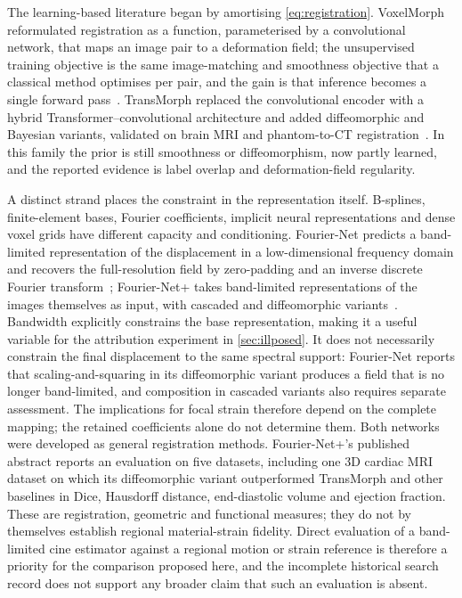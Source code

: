 The learning-based literature began by amortising \cref{eq:registration}. VoxelMorph reformulated registration as a function, parameterised by a convolutional network, that maps an image pair to a deformation field; the unsupervised training objective is the same image-matching and smoothness objective that a classical method optimises per pair, and the gain is that inference becomes a single forward pass~\cite{balakrishnan2019voxelmorph}. TransMorph replaced the convolutional encoder with a hybrid Transformer--convolutional architecture and added diffeomorphic and Bayesian variants, validated on brain MRI and phantom-to-CT registration~\cite{chen2022transmorph}. In this family the prior is still smoothness or diffeomorphism, now partly learned, and the reported evidence is label overlap and deformation-field regularity.

A distinct strand places the constraint in the representation itself. B-splines, finite-element bases, Fourier coefficients, implicit neural representations and dense voxel grids have different capacity and conditioning. Fourier-Net predicts a band-limited representation of the displacement in a low-dimensional frequency domain and recovers the full-resolution field by zero-padding and an inverse discrete Fourier transform~\cite{jia2023fouriernet}; Fourier-Net+ takes band-limited representations of the images themselves as input, with cascaded and diffeomorphic variants~\cite{jia2026fouriernetplus}. Bandwidth explicitly constrains the base representation, making it a useful variable for the attribution experiment in \cref{sec:illposed}. It does not necessarily constrain the final displacement to the same spectral support: Fourier-Net reports that scaling-and-squaring in its diffeomorphic variant produces a field that is no longer band-limited, and composition in cascaded variants also requires separate assessment. The implications for focal strain therefore depend on the complete mapping; the retained coefficients alone do not determine them. Both networks were developed as general registration methods. Fourier-Net+'s published abstract reports an evaluation on five datasets, including one 3D cardiac MRI dataset on which its diffeomorphic variant outperformed TransMorph and other baselines in Dice, Hausdorff distance, end-diastolic volume and ejection fraction. These are registration, geometric and functional measures; they do not by themselves establish regional material-strain fidelity. Direct evaluation of a band-limited cine estimator against a regional motion or strain reference is therefore a priority for the comparison proposed here, and the incomplete historical search record does not support any broader claim that such an evaluation is absent.

